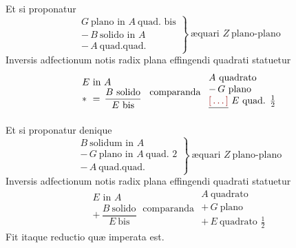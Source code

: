\documentclass[11pt,a4paper]{article}
\begin{document}
Et si proponatur
\[ \left.\begin{array}{l} G\ \text{plano in } A\ \text{quad. bis} \\ -\,B\ \text{solido in } A \\ -\,A\ \text{quad.quad.} \end{array}\right\}\ \text{æquari } Z\ \text{plano-plano} \]
Inversis adfectionum notis radix plana effingendi quadrati statuetur
\[ \begin{array}{l} E \text{ in } A \\ *\ =\,\dfrac{B\ \text{solido}}{E\ \text{bis}} \end{array}\ \text{comparanda } \begin{array}{l} A\ \text{quadrato} \\ -\,G\ \text{plano} \\ \struck{\ill{}}\ E\ \text{quad. } \frac{1}{2} \end{array} \]

Et si proponatur denique
\[ \left.\begin{array}{l} B\ \text{solidum in } A \\ -\,G\ \text{plano in } A\ \text{quad. } 2 \\ -\,A\ \text{quad.quad.} \end{array}\right\}\ \text{æquari } Z\ \text{plano-plano} \]
Inversis adfectionum notis radix plana effingendi quadrati statuetur
\[ \begin{array}{l} E \text{ in } A \\ +\,\dfrac{B\ \text{solido}}{E\ \text{bis}} \end{array}\ \text{comparanda } \begin{array}{l} A\ \text{quadrato} \\ +\,G\ \text{plano} \\ +\,E\ \text{quadrato } \frac{1}{2} \end{array} \]
Fit itaque  reductio quæ imperata est.
\end{document}

